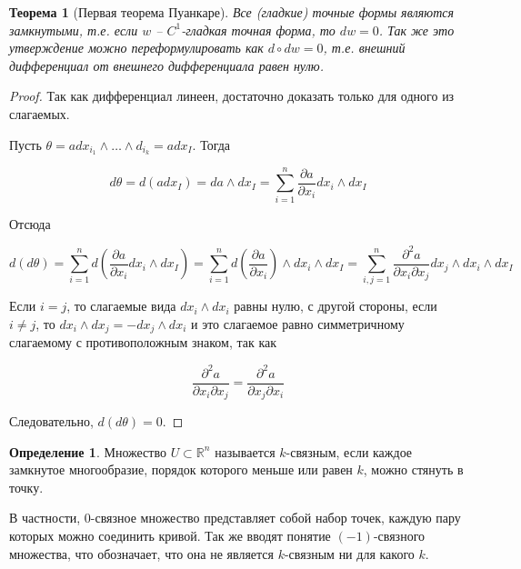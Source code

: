\documentclass[a5paper]{article}
\newcounter{through}
\theoremstyle{plain}
\newtheorem{theorem}[through]{Теорема}
\theoremstyle{definition}
\newtheorem{definition}[through]{Определение}
\numberwithin{through}{section}
\numberwithin{equation}{section}
\begin{document}
\begin{theorem}[Первая теорема Пуанкаре]
	Все (гладкие) точные формы являются замкнутыми, т.е. если $w$ -- $C^1$-гладкая точная форма, то $dw = 0$. Так же это утверждение можно переформулировать как $d \circ d w = 0$, т.е. внешний дифференциал от внешнего дифференциала равен нулю. 
\end{theorem}

\begin{proof}
	Так как дифференциал линеен, достаточно доказать только для одного из слагаемых.
	
	Пусть $\theta = adx_{i_1} \wedge \ldots \wedge d_{i_k} = adx_I$. Тогда
	
	\begin{equation*}
		d\theta = d(a dx_I) = da \wedge dx_I = \sum\limits_{i=1}^{n} \frac{\partial a}{\partial x_i} dx_i \wedge dx_I
	\end{equation*}
	
	Отсюда
	
	\begin{equation*}
		d(d\theta) = \sum\limits_{i=1}^{n} d(\frac{\partial a}{\partial x_i} dx_i \wedge dx_I) = \sum\limits_{i=1}^{n} d (\frac{\partial a}{\partial x_i}) \wedge dx_i \wedge dx_I = \sum\limits_{i,j=1}^{n} \frac{\partial^2 a}{\partial x_i \partial x_j} dx_j \wedge dx_i \wedge dx_I
	\end{equation*}
	
	Если $i = j$, то слагаемые вида $dx_i \wedge dx_i$ равны нулю, с другой стороны, если $i \not= j$, то $dx_i \wedge dx_j = - dx_j \wedge dx_i$ и это слагаемое равно симметричному слагаемому с противоположным знаком, так как
	
	\begin{equation*}
		\frac{\partial^2 a}{\partial x_i \partial x_j} = \frac{\partial^2 a}{\partial x_j \partial x_i}
	\end{equation*}
	
	Следовательно, $d (d \theta) = 0$.
\end{proof}

\begin{definition}
	Множество $U \subset \mathbb{R}^n$ называется $k$-связным, если каждое замкнутое многообразие, порядок которого меньше или равен $k$, можно стянуть в точку.
\end{definition}

В частности, $0$-связное множество представляет собой набор точек, каждую пару которых можно соединить кривой. Так же вводят понятие $(-1)$-связного множества, что обозначает, что она не является $k$-связным ни для какого $k$.
\end{document}
